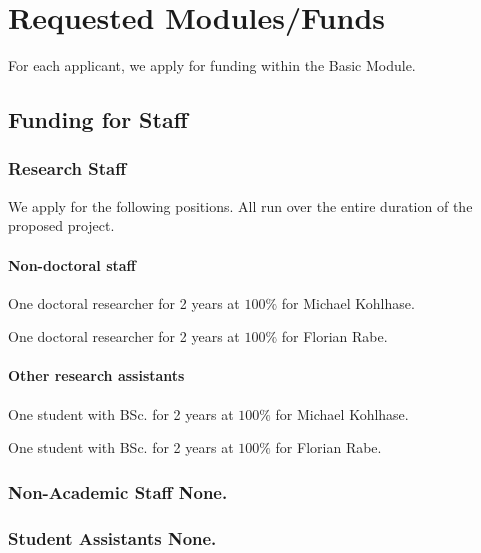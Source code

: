 \section{Requested Modules/Funds}\label{sec:funds}

For each applicant, we apply for funding within the Basic Module.

\subsection{Funding for Staff}\label{sec:positions}

\subsubsection{Research Staff}\label{sec:positions:research}

We apply for the following positions. All run over the entire duration of the proposed project.

\paragraph*{Non-doctoral staff}

One doctoral researcher for 2 years at $100 \%$ for Michael Kohlhase.

One doctoral researcher for 2 years at $100 \%$ for Florian Rabe.


\paragraph*{Other research assistants}

One student with BSc. for 2 years at $100 \%$ for Michael Kohlhase.

One student with BSc. for 2 years at $100 \%$ for Florian Rabe.

\subsubsection{Non-Academic Staff \qquad None.}

\subsubsection{Student Assistants \qquad None.}

